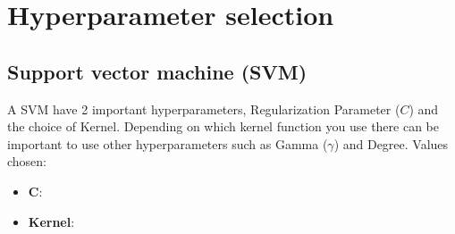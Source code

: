 \section{Hyperparameter selection}
\subsection{Support vector machine (SVM)}
A SVM have 2 important hyperparameters, Regularization Parameter (\(C\)) and the choice of Kernel.
Depending on which kernel function you use there can be important to use other hyperparameters such as Gamma (\(\gamma\)) and Degree.
Values chosen:
\begin{itemize}
    \item \textbf{\(\boldsymbol{C}\)}:
    \item \textbf{Kernel}:
\end{itemize}
 
